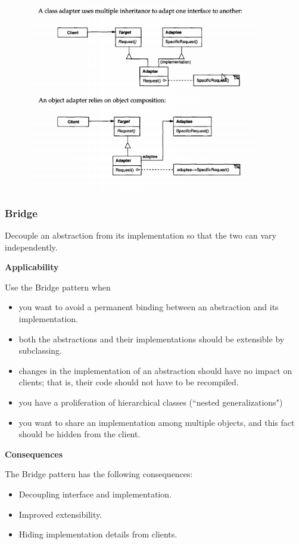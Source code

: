 \documentclass{article}
\begin{document}
\begin{figure}[h]
    \centering
    \includegraphics[width=10cm]{diagrams/pattern-6-adapter.png}
\end{figure}

\newpage
\subsubsection{Bridge}
Decouple an abstraction from its implementation so that the two can vary independently.

\textbf{Applicability}

Use the Bridge pattern when

\begin{itemize}
    \item you want to avoid a permanent binding between an abstraction and its implementation. 
    \item both the abstractions and their implementations should be extensible by subclassing.
    \item changes in the implementation of an abstraction should have no impact on clients; that is, their code should not have to be recompiled.
    \item you have a proliferation of hierarchical classes (``nested generalizations")
    \item you want to share an implementation among multiple objects, and this fact should be hidden from the client.
\end{itemize}

\textbf{Consequences}

The Bridge pattern has the following consequences:

\begin{itemize}
    \item Decoupling interface and implementation.
    \item Improved extensibility. 
    \item Hiding implementation details from clients. 
\end{itemize}
\end{document}
